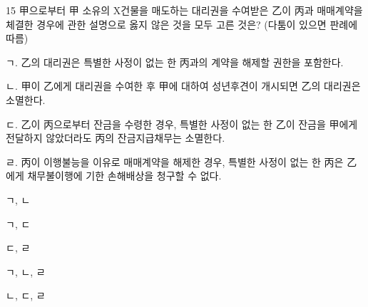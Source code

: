 \begin{question}{15}
甲으로부터 甲 소유의 X건물을 매도하는 대리권을 수여받은 乙이 丙과 매매계약을 체결한 경우에 관한 설명으로 옳지 않은 것을 모두 고른 것은? (다툼이 있으면 판례에 따름)
\begin{framedtext}
ㄱ. 乙의 대리권은 특별한 사정이 없는 한 丙과의 계약을 해제할 권한을 포함한다. \par
ㄴ. 甲이 乙에게 대리권을 수여한 후 甲에 대하여 성년후견이 개시되면 乙의 대리권은 소멸한다. \par
ㄷ. 乙이 丙으로부터 잔금을 수령한 경우, 특별한 사정이 없는 한 乙이 잔금을 甲에게 전달하지 않았더라도 丙의 잔금지급채무는 소멸한다. \par
ㄹ. 丙이 이행불능을 이유로 매매계약을 해제한 경우, 특별한 사정이 없는 한 丙은 乙에게 채무불이행에 기한 손해배상을 청구할 수 없다. \par
\end{framedtext}
\begin{choices}
  \item ㄱ, ㄴ
  \item ㄱ, ㄷ
  \item ㄷ, ㄹ
  \item ㄱ, ㄴ, ㄹ
  \item ㄴ, ㄷ, ㄹ
\end{choices}
\end{question}
